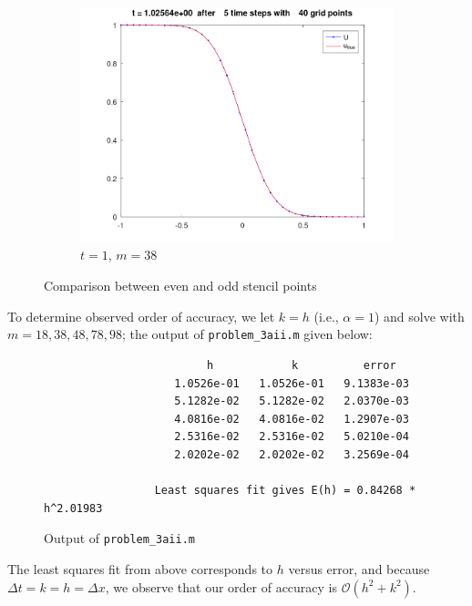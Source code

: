 \begin{solution}
\begin{enumerate}
\begin{figure}[h]
\begin{subfigure}[b]{0.4\textwidth}
                      \includegraphics[width=\textwidth]{problem_3aii_m-38_heatCN_t-5.png}
                      \caption{$t = 1$, $m = 38$}
                  \end{subfigure}
                  \caption[]{Comparison between even and odd stencil points}
              \end{figure}
              
              To determine observed order of accuracy, we let $k = h$ (i.e., $\alpha = 1$) and solve with 
              $m = 18, 38, 48, 78, 98$; the output of \texttt{problem\_3aii.m} given below:

              \begin{figure}[h]
                  \centering
                  \begin{verbatim}
                         h            k          error
                    1.0526e-01   1.0526e-01   9.1383e-03
                    5.1282e-02   5.1282e-02   2.0370e-03
                    4.0816e-02   4.0816e-02   1.2907e-03
                    2.5316e-02   2.5316e-02   5.0210e-04
                    2.0202e-02   2.0202e-02   3.2569e-04
                  
                 Least squares fit gives E(h) = 0.84268 * h^2.01983
                  \end{verbatim}
                  \caption{Output of \texttt{problem\_3aii.m}}
              \end{figure}
              
              The least squares fit from above corresponds to $h$ versus error, and because \linebreak
              $\Delta t = k = h = \Delta x$, we observe that our order of accuracy is 
              $\mathcal{O}\left(h^2 + k^2\right)$.
    \end{enumerate}
    \ \\
\end{solution}